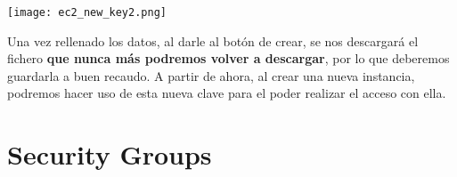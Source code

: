 \begin{center}
	\texttt{[image: ec2\_new\_key2.png]}
\end{center}

Una vez rellenado los datos, al darle al botón de crear, se nos descargará el fichero \textbf{que nunca más podremos volver a descargar}, por lo que deberemos guardarla a buen recaudo. A partir de ahora, al crear una nueva instancia, podremos hacer uso de esta nueva clave para el poder realizar el acceso con ella.


\chapter{Security Groups}




